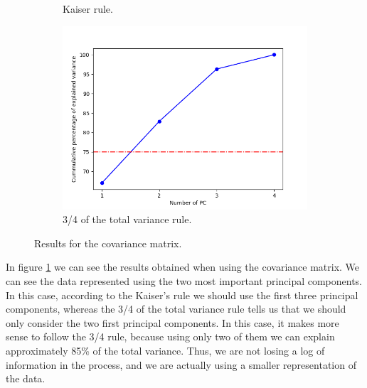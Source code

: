 \documentclass[11pt,a4paper]{article}
\begin{document}
\begin{figure}[H]
\begin{subfigure}[t]{.5\textwidth}
    \caption{Kaiser rule.}
  \end{subfigure}
  \begin{subfigure}[t]{.5\textwidth}
    \centering
    \includegraphics[scale=0.4]{img/pc_covariance_variance}
    \caption{3/4 of the total variance rule.}
  \end{subfigure}
  \caption{Results for the covariance matrix.}
  \label{fig:pc-covariance}
\end{figure}

In figure \ref{fig:pc-covariance} we can see the results obtained when using the covariance matrix. We can see
the data represented using the two most important principal components. In this case, according to the Kaiser's
rule we should use the first three principal components, whereas the 3/4 of the total variance rule tells us
that we should only consider the two first principal components. In this case, it makes more sense to follow the
3/4 rule, because using only two of them we can explain approximately 85\% of the total variance. Thus, we are
not losing a log of information in the process, and we are actually using a smaller representation of the data.
\end{document}

